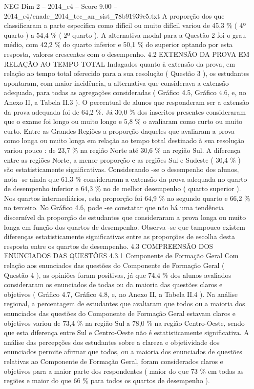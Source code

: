 \begin{textsample}{NEG Dim 2 – 2014\_c4 – Score 9.00 – 2014\_c4/enade\_2014\_tec\_an\_sist\_78b91939e5.txt}
A proporção dos que classificaram a parte específica como difícil ou muito difícil variou de 45,3 \% ( 4º quarto ) a 54,4 \% ( 2º quarto ).
A alternativa modal para a Questão 2 foi o grau médio, com 42,2 \% do quarto inferior e 50,1 \% do superior optando por esta resposta, valores crescentes com o desempenho. 4.2 EXTENSÃO DA PROVA EM RELAÇÃO AO TEMPO TOTAL Indagados quanto à extensão da prova, em relação ao tempo total oferecido para a sua resolução ( Questão 3 ), os estudantes apontaram, com maior incidência, a alternativa que considerava a extensão adequada, para todas as agregações consideradas ( Gráfico 4.5, Gráfico 4.6, e, no Anexo II, a Tabela II.3 ).
O percentual de alunos que responderam ser a extensão da prova adequada foi de 64,2 \%.
Já 30,0 \% dos inscritos presentes consideraram que o exame foi longo ou muito longo e 5,8 \% o avaliaram como curto ou muito curto.
Entre as Grandes Regiões a proporção daqueles que avaliaram a prova como longa ou muito longa em relação ao tempo total destinado à sua resolução variou pouco : de 23,7 \% na região Norte até 30,6 \% na região Sul.
A diferença entre as regiões Norte, a menor proporção e as regiões Sul e Sudeste ( 30,4 \% ) são estatisticamente significativas.
Considerando -se o desempenho dos alunos, nota -se ainda que 61,3 \% consideraram a extensão da prova adequada no quarto de desempenho inferior e 64,3 \% no de melhor desempenho ( quarto superior ).
Nos quartos intermediários, esta proporção foi 64,9 \% no segundo quarto e 66,2 \% no terceiro.
No Gráfico 4.6, pode -se constatar que não há uma tendência discernível da proporção de estudantes que consideraram a prova longa ou muito longa em função dos quartos de desempenho.
Observa -se que tampouco existem diferenças estatisticamente significativas entre as proporções de escolha desta resposta entre os quartos de desempenho. 4.3 COMPREENSÃO DOS ENUNCIADOS DAS QUESTÕES 4.3.1 Componente de Formação Geral Com relação aos enunciados das questões do Componente de Formação Geral ( Questão 4 ), as opiniões foram positivas, já que 74,4 \% dos alunos avaliados consideraram os enunciados de todas ou da maioria das questões claros e objetivos ( Gráfico 4.7, Gráfico 4.8, e, no Anexo II, a Tabela II.4 ).
Na análise regional, a percentagem de estudantes que avaliaram que todos ou a maioria dos enunciados das questões do Componente de Formação Geral estavam claros e objetivos variou de 73,4 \% na região Sul a 78,0 \% na região Centro-Oeste, sendo que esta diferença entre Sul e Centro-Oeste não é estatisticamente significativa.
A análise das percepções dos estudantes sobre a clareza e objetividade dos enunciados permite afirmar que todos, ou a maioria dos enunciados de questões relativas ao Componente de Formação Geral, foram considerados claros e objetivos para a maior parte dos respondentes ( maior do que 73 \% em todas as regiões e maior do que 66 \% para todos os quartos de desempenho ).

\end{textsample}
